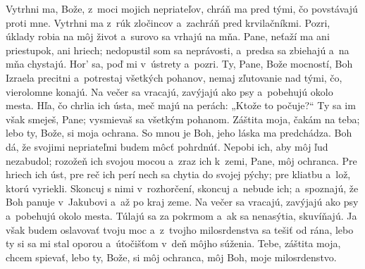 Vytrhni ma, Bože, z~moci mojich nepriateľov,
chráň ma pred tými, čo povstávajú proti mne.
\versseparator
Vytrhni ma z~rúk zločincov
a~zachráň pred krvilačníkmi.
\versseparator
Pozri, úklady robia na môj život
a~surovo sa vrhajú na mňa.
\versseparator
Pane, neťaží ma ani priestupok, ani hriech;
nedopustil som sa neprávosti, a~predsa sa zbiehajú a~na mňa chystajú.
\versseparator
Hor’ sa, poď mi v~ústrety a~pozri.
Ty, Pane, Bože mocností, Boh Izraela
\versseparator
precitni a~potrestaj všetkých pohanov,
nemaj zľutovanie nad tými, čo, vierolomne konajú.
\versseparator
Na večer sa vracajú, zavýjajú ako psy
a~pobehujú okolo mesta.
\versseparator
Hľa, čo chrlia ich ústa,
meč majú na perách: „Ktože to počuje?“
\versseparator
Ty sa im však smeješ, Pane;
vysmievaš sa všetkým pohanom.
\versseparator
Záštita moja, čakám na teba;
lebo ty, Bože, si moja ochrana.
So mnou je Boh, jeho láska ma predchádza.
\versseparator
Boh dá, že svojimi nepriateľmi budem môcť pohrdnúť.
Nepobi ich, aby môj ľud nezabudol;
\versseparator
rozožeň ich svojou mocou
a~zraz ich k~zemi, Pane, môj ochranca.
\versseparator
Pre hriech ich úst, pre reč ich perí
nech sa chytia do svojej pýchy;
\versseparator
pre kliatbu a~lož, ktorú vyriekli.
Skoncuj s nimi v~rozhorčení,
skoncuj a~nebude ich;
\versseparator
a~spoznajú, že Boh panuje v~Jakubovi a~až po kraj zeme.
\versseparator
Na večer sa vracajú, zavýjajú ako psy
a~pobehujú okolo mesta.
\versseparator
Túlajú sa za pokrmom
a~ak sa nenasýtia, skuvíňajú.
\versseparator
Ja však budem oslavovať tvoju moc
a~z~tvojho milosrdenstva sa tešiť od rána,
\versseparator
lebo ty si sa mi stal oporou
a~útočišťom v~deň môjho súženia.
\versseparator
Tebe, záštita moja, chcem spievať,
lebo ty, Bože, si môj ochranca,
môj Boh, moje milosrdenstvo.
